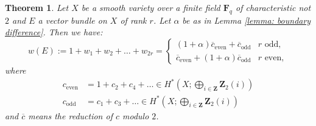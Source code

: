 \documentclass[10pt, reqno]{amsart}
\numberwithin{equation}{subsection}
\newcommand{\F}{\mathbf{F}}
\newcommand{\Z}{\mathbf{Z}}
\newcommand{\ol}[1]{\overline{#1}}
\DeclareMathOperator{\et}{\acute{e}t}
\DeclareMathOperator{\odd}{odd}
\DeclareMathOperator{\even}{even}
\newtheorem{thm}{Theorem}[section]
\theoremstyle{remark}
\begin{document}
\begin{thm}\label{thm: chern classes}
Let $X$ be a smooth variety over a finite field $\F_q$ of characteristic not $2$ and $E$ a vector bundle on $X$ of rank $r$. Let $\alpha$ be as in Lemma \ref{lemma: boundary difference}. Then we have:
\[
w(E) := 1+w_1 + w_2 + \ldots + w_{2r} =  \begin{cases} (1+\alpha) \ol{c}_{\even} + \ol{c}_{\odd} & r \text{ odd}, \\ \ol{c}_{\even} + (1+\alpha) \ol{c}_{\odd} & r \text{ even}, \end{cases}
\]
where 
\begin{align*}
c_{\even} &= 1 + c_2 + c_4 + \ldots  \in H^*_{\et}(X;\bigoplus_{i\in \Z} \Z_2(i))\\
c_{\odd} &= c_1 + c_3 + \ldots  \in H^*_{\et}(X;\bigoplus_{i\in \Z} \Z_2(i))
\end{align*}
and $\ol{c}$ means the reduction of $c$ modulo $2$. 
\end{thm}
\end{document}
